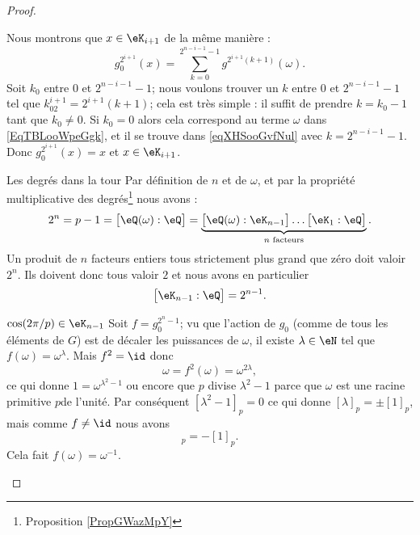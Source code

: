 \begin{proof}
\begin{subproof}
\begin{subproof}
                        Nous montrons que \( x\in \eK_{i+1}\) de la même manière :
                        \begin{equation}    \label{eqXHSooGvfNul}
                            g_0^{2^{i+1}}(x)=\sum_{k=0}^{2^{n-i-1}-1}g^{2^{i+1}(k+1)}(\omega).
                        \end{equation}
                        Soit \( k_0\) entre \( 0\) et \( 2^{n-i-1}-1\); nous voulons trouver un \( k\) entre \( 0\) et \( 2^{n-i-1}-1\) tel que \( k_02^{i+1}=2^{i+1}(k+1)\); cela est très simple : il suffit de prendre \( k=k_0-1\) tant que \( k_0\neq 0\). Si \( k_0=0\) alors cela correspond au terme \( \omega\) dans \eqref{EqTBLooWpeGgk}, et il se trouve dans \eqref{eqXHSooGvfNul} avec \( k=2^{n-i-1}-1\). Donc \( g_0^{2^{i+1}}(x)=x\) et \( x\in \eK_{i+1}\).
                    \item[Les degrés dans la tour]
                        Par définition de \( n\) et de \( \omega\), et par la propriété multiplicative des degrés\footnote{Proposition \ref{PropGWazMpY}} nous avons :
                        \begin{equation}
                            2^n=p-1=\big[ \eQ(\omega):\eQ \big]=\underbrace{\big[ \eQ(\omega):\eK_{n-1} \big]\ldots\big[ \eK_1:\eQ \big]}_{\text{\( n\) facteurs}}.
                        \end{equation}
                        Un produit de \( n\) facteurs entiers tous strictement plus grand que zéro doit valoir \( 2^n\). Ils doivent donc tous valoir \( 2\) et nous avons en particulier
                        \begin{equation}
                            \big[ \eK_{n-1}:\eQ \big]=2^{n-1}.
                        \end{equation}
                    \item[\( \cos(2\pi/p)\in \eK_{n-1}\)]
                        Soit \( f=g_0^{2^n-1}\); vu que l'action de \( g_0\) (comme de tous les éléments de \( G\)) est de décaler les puissances de \( \omega\), il existe \( \lambda\in \eN\) tel que \( f(\omega)=\omega^{\lambda}\). Mais \( f^2=\id\) donc
                        \begin{equation}
                            \omega=f^2(\omega)=\omega^{2\lambda},
                        \end{equation}
                        ce qui donne \( 1=\omega^{\lambda^2-1}\) ou encore que \( p\) divise \( \lambda^2-1\) parce que \( \omega\) est une racine primitive \( p\)\ieme de l'unité. Par conséquent \( [\lambda^2-1]_p=0\) ce qui donne \( [\lambda]_p=\pm[1]_p\), mais comme \( f\neq \id\) nous avons
                        \begin{equation}
                            [\lambda]_p=-[1]_p.
                        \end{equation}
                        Cela fait \( f(\omega)=\omega^{-1}\).


\end{subproof}
\end{subproof}
\end{proof}
